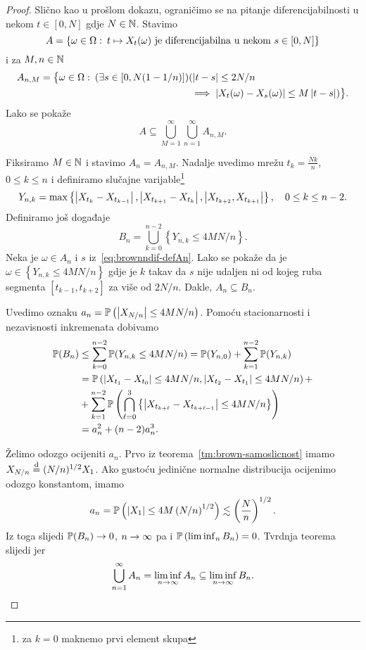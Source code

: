 \documentclass[main.tex]{subfiles}
\begin{document}
\begin{proof}
	Slično kao u prošlom dokazu, ograničimo se na pitanje diferencijabilnosti u nekom
	\( t \in \left[ 0, N \right] \) gdje \( N \in \N \). Stavimo
	\[ A = \left\{ \omega \in \Omega \st t \mapsto X_t(\omega)\mathrm{\ je \ diferencijabilna \ u\ nekom \  } s \in \left[ 0, N \right] \right\}  \]
	i za \( M, n \in \N \)
	\begin{equation} \label{eq:brownndif-defAn}
		\begin{aligned}
			A_{n, M} = \bigl\{ \omega \in \Omega \st (\exists s \in [ 0, N(1 - 1/n) ]) & (\abs{t-s} \le 2N/n \\  & \implies \abs{X_t(\omega) - X_s(\omega)} \le M\abs{t-s}) \bigr\}.
		\end{aligned}
	\end{equation}
	Lako se pokaže
	\[
		A \subseteq \bigcup_{M=1}^\infty \bigcup_{n=1}^\infty A_{n, M}.
	\]

	Fiksiramo \( M \in \N \) i stavimo \( A_n=A_{n,M} \). Nadalje uvedimo mrežu \( t_k = \frac{Nk}n \), \( 0\le k\le n \) i definiramo slučajne varijable\footnote{za \( k=0 \) maknemo prvi element skupa}
	\begin{equation}
		Y_{n, k} = \max \left\{ \abs{X_{t_k} - X_{t_{k-1}}}, \abs{X_{t_{k+1}}-X_{t_k}}, \abs{X_{t_{k+2}}, X_{t_{k+1}}}  \right\}, \quad 0 \le k \le n-2.
	\end{equation}
	Definiramo još događaje
	\begin{equation}
		B_n = \bigcup_{k=0}^{n-2} \left\{ Y_{n,k} \le 4MN/n \right\}.
	\end{equation}
	Neka je \( \omega \in A_n \) i \( s \) iz~\eqref{eq:brownndif-defAn}. Lako se pokaže da je \( \omega \in \left\{ Y_{n,k} \le 4MN/n \right\} \) gdje je \( k \) takav da \( s \) nije udaljen ni od kojeg ruba segmenta
	\( \left[ t_{k-1}, t_{k+2} \right] \) za više od \( 2N/n \). Dakle, \( A_n \subseteq B_n \).

	Uvedimo oznaku \( a_n = \P\left(\abs{X_{N/n}} \le 4MN/n \right) \). Pomoću stacionarnosti i nezavisnosti inkremenata dobivamo
	\begin{align}
		\P(B_n) & \le \sum_{k=0}^{n-2} \P(Y_{n, k} \le 4MN/n) = \P(Y_{n, 0}) + \sum_{k=1}^{n-2} \P(Y_{n, k}) \\
		        & =  \P\left(\abs{X_{t_1}-X_{t_0}} \le 4MN/n, \abs{X_{t_2} - X_{t_1}} \le 4MN/n\right) +     \\&+
		\sum_{k=1}^{n-2} \P\left(\bigcap_{\ell=0}^3 \left\{ \abs{X_{t_{k+\ell}} - X_{t_{k+\ell-1}}} \le 4MN/n \right\} \right)
		\\ &= a_n^2 + (n-2)a_n^3.
	\end{align}

	Želimo odozgo ocijeniti \( a_n \). Prvo iz teorema~\ref{tm:brown-samoslicnost} imamo \( X_{N/n} \jpod (N/n)^{1/2} X_1 \). Ako gustoću jedinične normalne distribucija ocijenimo odozgo konstantom, imamo
	\[
		a_n = \P\left(\abs{X_1} \le 4M \left( N/n \right)  ^{1/2}\right) \lesssim \left( \frac Nn \right)^{1/2}.
	\]
	Iz toga slijedi \( \P(B_n) \un \), \( n \ub \) pa i \( \P\left( \liminf_n B_n \right) = 0 \). Tvrdnja teorema slijedi jer
	\[
		\bigcup_{n=1}^\infty A_n = \liminf_{n \ub} A_n \subseteq \liminf_{n \ub} B_n.
	\]
\end{proof}
\end{document}
